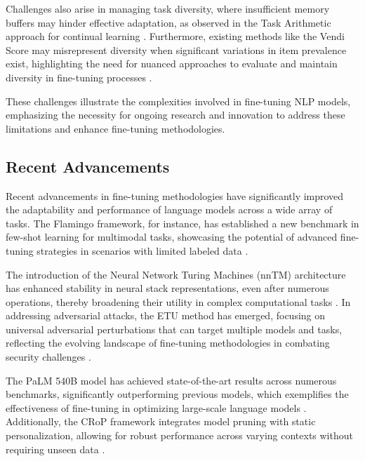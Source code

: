 Challenges also arise in managing task diversity, where insufficient memory buffers may hinder effective adaptation, as observed in the Task Arithmetic approach for continual learning \cite{chitale2023taskarithmeticloracontinual}. Furthermore, existing methods like the Vendi Score may misrepresent diversity when significant variations in item prevalence exist, highlighting the need for nuanced approaches to evaluate and maintain diversity in fine-tuning processes \cite{pasarkar2024cousinsvendiscorefamily}.

These challenges illustrate the complexities involved in fine-tuning NLP models, emphasizing the necessity for ongoing research and innovation to address these limitations and enhance fine-tuning methodologies.

\subsection{Recent Advancements} \label{subsec:Recent Advancements}

Recent advancements in fine-tuning methodologies have significantly improved the adaptability and performance of language models across a wide array of tasks. The Flamingo framework, for instance, has established a new benchmark in few-shot learning for multimodal tasks, showcasing the potential of advanced fine-tuning strategies in scenarios with limited labeled data \cite{alayrac2022flamingo}.

The introduction of the Neural Network Turing Machines (nnTM) architecture has enhanced stability in neural stack representations, even after numerous operations, thereby broadening their utility in complex computational tasks \cite{stogin2022provablystableneuralnetwork}. In addressing adversarial attacks, the ETU method has emerged, focusing on universal adversarial perturbations that can target multiple models and tasks, reflecting the evolving landscape of fine-tuning methodologies in combating security challenges \cite{zhang2024universaladversarialperturbationsvisionlanguage}.

The PaLM 540B model has achieved state-of-the-art results across numerous benchmarks, significantly outperforming previous models, which exemplifies the effectiveness of fine-tuning in optimizing large-scale language models \cite{chowdhery2023palm}. Additionally, the CRoP framework integrates model pruning with static personalization, allowing for robust performance across varying contexts without requiring unseen data \cite{kaur2024cropcontextwiserobuststatic}.

